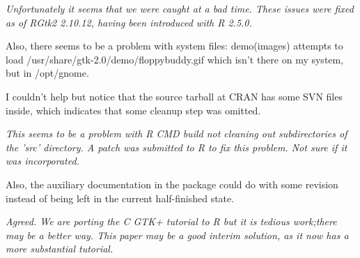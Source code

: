 \documentclass{article}
\begin{document}
\emph{Unfortunately it seems that we were caught at a bad time. These issues were fixed as of RGtk2 2.10.12, having been introduced with R 2.5.0.}

Also, there
seems to be a problem with system files: demo(images) attempts to load
/usr/share/gtk-2.0/demo/floppybuddy.gif which isn't there on my system,
but in /opt/gnome.

I couldn't help but notice that the source tarball at CRAN has some SVN files
inside, which indicates that some cleanup step was omitted.

\emph{This seems to be a problem with R CMD build not cleaning out subdirectories of the 'src' directory. A patch was submitted to R to fix this problem. Not sure if it was incorporated.}

Also, the auxiliary documentation in the package could do with some revision
instead of being left in the current half-finished state.

\emph{Agreed. We are porting the C GTK+ tutorial to R but it is tedious work;there may be a better way. This paper may be a good interim solution, as it now has a more substantial tutorial.}
\end{document}
